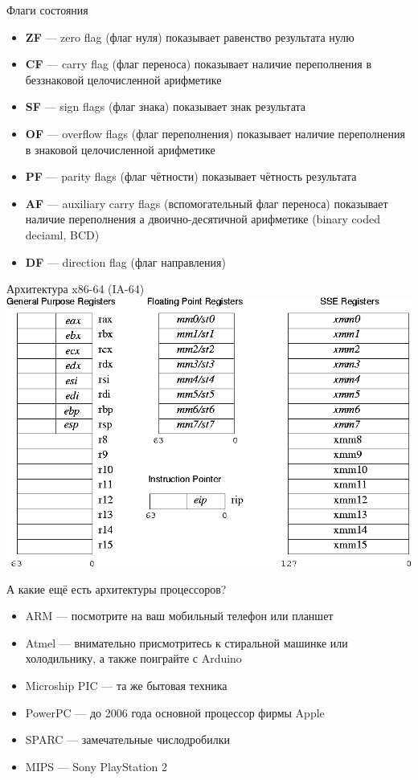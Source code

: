 \documentclass{beamer}
\begin{document}
    \begin{frame}{Флаги состояния}
        \begin{itemize}
            \item {\bf ZF} --- zero flag (флаг нуля) показывает равенство результата нулю
            \item {\bf CF} --- carry flag (флаг переноса) показывает наличие переполнения в беззнаковой целочисленной арифметике
            \item {\bf SF} --- sign flags (флаг знака) показывает знак результата
            \item {\bf OF} --- overflow flags (флаг переполнения) показывает наличие переполнения в знаковой целочисленной арифметике
            \item {\bf PF} --- parity flags (флаг чётности)  показывает чётность результата
            \item {\bf AF} --- auxiliary carry flags (вспомогательный флаг переноса) показывает наличие переполнения а двоично-десятичной арифметике (binary coded deciaml, BCD)
            \item {\bf DF} --- direction flag (флаг направления)
        \end{itemize}
    \end{frame}
    \begin{frame}{Архитектура x86-64 (IA-64)}
        \includegraphics[width=\linewidth]{fig/x86-64.png}
    \end{frame}
    \begin{frame}{А какие ещё есть архитектуры процессоров?}
        \begin{itemize}
            \item ARM --- посмотрите на ваш мобильный телефон или планшет
            \item Atmel --- внимательно присмотритесь к стиральной машинке или холодильнику, а также поиграйте с Arduino
            \item Microship PIC --- та же бытовая техника
            \item PowerPC --- до 2006 года основной процессор фирмы Apple
            \item SPARC --- замечательные числодробилки
            \item MIPS --- Sony PlayStation 2
        \end{itemize}
    \end{frame}
\end{document}
